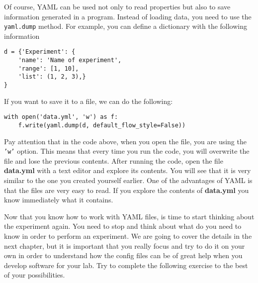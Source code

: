 Of course, YAML can be used not only to read properties but also to save information generated in a program. Instead of loading data, you need to use the \texttt{yaml.dump} method. For example, you can define a dictionary with the following information

\begin{verbatim}
d = {'Experiment': {
    'name': 'Name of experiment',
    'range': [1, 10],
    'list': (1, 2, 3),}
}
\end{verbatim}

If you want to save it to a file, we can do the following:

\begin{verbatim}
with open('data.yml', 'w') as f:
    f.write(yaml.dump(d, default_flow_style=False))
\end{verbatim}

Pay attention that in the code above, when you open the file, you are using the \texttt{'w'} option. This means that every time you run the code, you will overwrite the file and lose the previous contents. After running the code, open the file \textbf{data.yml} with a text editor and explore its contents. You will see that it is very similar to the one you created yourself earlier. One of the advantages of YAML is that the files are very easy to read. If you explore the contents of \textbf{data.yml} you know immediately what it contains.





Now that you know how to work with YAML files, is time to start thinking about the experiment again. You need to stop and think about what do you need to know in order to perform an experiment. We are going to cover the details in the next chapter, but it is important that you really focus and try to do it on your own in order to understand how the config files can be of great help when you develop software for your lab. Try to complete the following exercise to the best of your possibilities.

